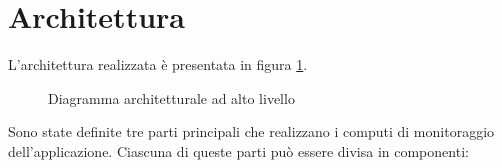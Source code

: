 \section{Architettura}
L'architettura realizzata è presentata in figura \ref{img:architecture}.

\begin{figure}[!ht]
\begin{center}
\caption{Diagramma architetturale ad alto livello}
\label{img:architecture}
\end{center}
\end{figure}

Sono state definite tre parti principali che realizzano i computi di monitoraggio dell'applicazione. Ciascuna di queste parti può essere divisa in componenti:

